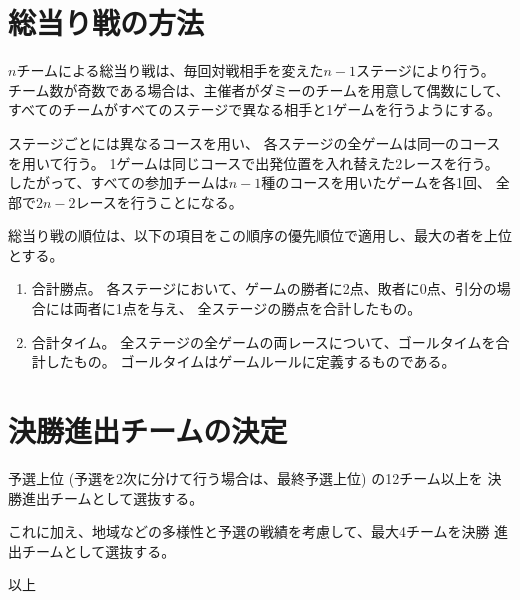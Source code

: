 \documentclass[11pt]{jarticle}
\begin{document}
\section{総当り戦の方法}
$n$チームによる総当り戦は、毎回対戦相手を変えた$n-1$ステージにより行う。
チーム数が奇数である場合は、主催者がダミーのチームを用意して偶数にして、
すべてのチームがすべてのステージで異なる相手と1ゲームを行うようにする。

ステージごとには異なるコースを用い、
各ステージの全ゲームは同一のコースを用いて行う。
1ゲームは同じコースで出発位置を入れ替えた2レースを行う。
したがって、すべての参加チームは$n-1$種のコースを用いたゲームを各1回、
全部で$2n-2$レースを行うことになる。

総当り戦の順位は、以下の項目をこの順序の優先順位で適用し、最大の者を上位とする。
\begin{enumerate}
\item
  合計勝点。
  各ステージにおいて、ゲームの勝者に2点、敗者に0点、引分の場合には両者に1点を与え、
  全ステージの勝点を合計したもの。
\item
  合計タイム。
  全ステージの全ゲームの両レースについて、ゴールタイムを合計したもの。
  ゴールタイムはゲームルールに定義するものである。
\end{enumerate}

\section{決勝進出チームの決定}
予選上位 (予選を2次に分けて行う場合は、最終予選上位) の12チーム以上を
決勝進出チームとして選抜する。

これに加え、地域などの多様性と予選の戦績を考慮して、最大4チームを決勝
進出チームとして選抜する。

\begin{flushright}
以上
\end{flushright}
\end{document}

